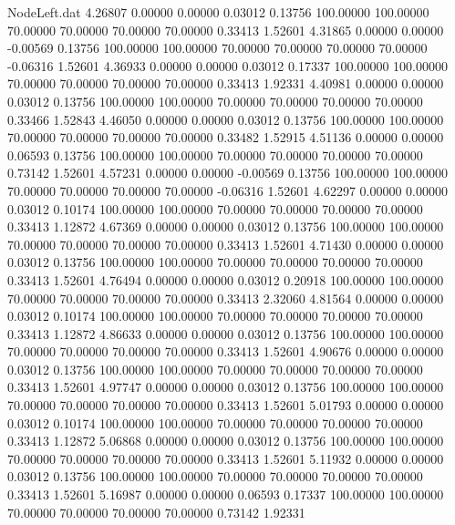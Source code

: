 \begin{filecontents}{NodeLeft.dat}
   4.26807    0.00000    0.00000     0.03012    0.13756  100.00000  100.00000   70.00000   70.00000   70.00000   70.00000    0.33413    1.52601
   4.31865    0.00000    0.00000    -0.00569    0.13756  100.00000  100.00000   70.00000   70.00000   70.00000   70.00000   -0.06316    1.52601
   4.36933    0.00000    0.00000     0.03012    0.17337  100.00000  100.00000   70.00000   70.00000   70.00000   70.00000    0.33413    1.92331
   4.40981    0.00000    0.00000     0.03012    0.13756  100.00000  100.00000   70.00000   70.00000   70.00000   70.00000    0.33466    1.52843
   4.46050    0.00000    0.00000     0.03012    0.13756  100.00000  100.00000   70.00000   70.00000   70.00000   70.00000    0.33482    1.52915
   4.51136    0.00000    0.00000     0.06593    0.13756  100.00000  100.00000   70.00000   70.00000   70.00000   70.00000    0.73142    1.52601
   4.57231    0.00000    0.00000    -0.00569    0.13756  100.00000  100.00000   70.00000   70.00000   70.00000   70.00000   -0.06316    1.52601
   4.62297    0.00000    0.00000     0.03012    0.10174  100.00000  100.00000   70.00000   70.00000   70.00000   70.00000    0.33413    1.12872
   4.67369    0.00000    0.00000     0.03012    0.13756  100.00000  100.00000   70.00000   70.00000   70.00000   70.00000    0.33413    1.52601
   4.71430    0.00000    0.00000     0.03012    0.13756  100.00000  100.00000   70.00000   70.00000   70.00000   70.00000    0.33413    1.52601
   4.76494    0.00000    0.00000     0.03012    0.20918  100.00000  100.00000   70.00000   70.00000   70.00000   70.00000    0.33413    2.32060
   4.81564    0.00000    0.00000     0.03012    0.10174  100.00000  100.00000   70.00000   70.00000   70.00000   70.00000    0.33413    1.12872
   4.86633    0.00000    0.00000     0.03012    0.13756  100.00000  100.00000   70.00000   70.00000   70.00000   70.00000    0.33413    1.52601
   4.90676    0.00000    0.00000     0.03012    0.13756  100.00000  100.00000   70.00000   70.00000   70.00000   70.00000    0.33413    1.52601
   4.97747    0.00000    0.00000     0.03012    0.13756  100.00000  100.00000   70.00000   70.00000   70.00000   70.00000    0.33413    1.52601
   5.01793    0.00000    0.00000     0.03012    0.10174  100.00000  100.00000   70.00000   70.00000   70.00000   70.00000    0.33413    1.12872
   5.06868    0.00000    0.00000     0.03012    0.13756  100.00000  100.00000   70.00000   70.00000   70.00000   70.00000    0.33413    1.52601
   5.11932    0.00000    0.00000     0.03012    0.13756  100.00000  100.00000   70.00000   70.00000   70.00000   70.00000    0.33413    1.52601
   5.16987    0.00000    0.00000     0.06593    0.17337  100.00000  100.00000   70.00000   70.00000   70.00000   70.00000    0.73142    1.92331

\end{filecontents}
